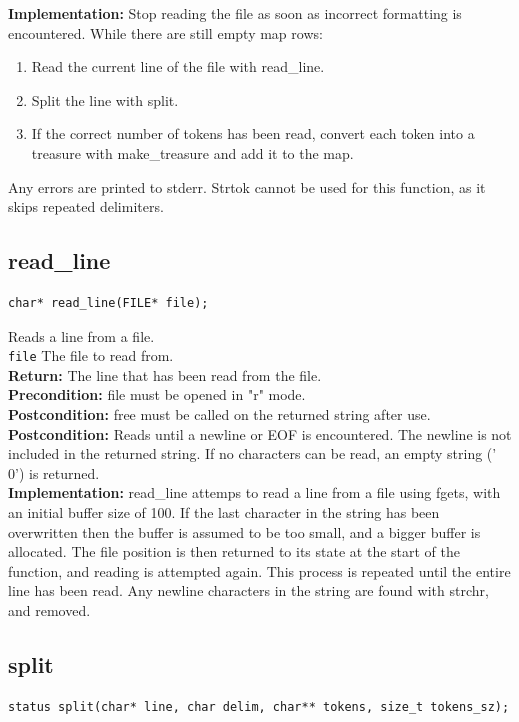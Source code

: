 \documentclass{article}
\begin{document}
 
 \textbf{Implementation:}
Stop reading the file as soon as incorrect formatting is encountered.
While there are still empty map rows:
\begin{enumerate}
 \item Read the current line of the file with  read\_line.
 \item Split the line with  split.
 \item If the correct number of tokens has been read, convert each token
     into a treasure with  make\_treasure and add it to the map.
\end{enumerate}
Any errors are printed to stderr.
Strtok cannot be used for this function, as it skips repeated delimiters.
 

\subsection{read\_line}
\begin{lstlisting}
char* read_line(FILE* file);
\end{lstlisting}


  Reads a line from a file.\\ 
 \texttt{file} The file to read from.\\ 
 \textbf{Return:} The line that has been read from the file.\\ 
 \textbf{Precondition:}  file must be opened in "r" mode.\\ 
 \textbf{Postcondition:}  free must be called on the returned string after use.\\ 
 \textbf{Postcondition:} 
  Reads until a newline or EOF is encountered.
     The newline is not included in the returned string.
     If no characters can be read, an empty string ('\\0') is returned.\\ 
 
 
 \textbf{Implementation:}
 read\_line attemps to read a line from a file using fgets,
     with an initial buffer size of 100. If the last character
     in the string has been overwritten then the buffer is
     assumed to be too small, and a bigger buffer is allocated.
     The file position is then returned to its state at the
     start of the function, and reading is attempted again.
     This process is repeated until the entire line has been read.
Any newline characters in the string are found with strchr, and removed.
 

\subsection{split}
\begin{lstlisting}
status split(char* line, char delim, char** tokens, size_t tokens_sz);
\end{lstlisting}
\end{document}
